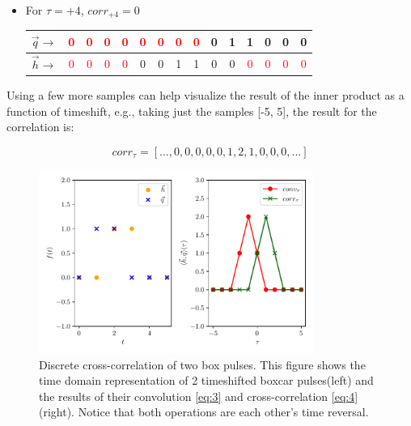 \begin{itemize}
\begin{center}
\end{center}


\item For $\tau = +4$, $corr_{+4}=0$

\begin{center}

\begin{tabular}{c|c|c|c|c| c|c|c|c|c|c |c|c|c|c|}

$\vec{q} \rightarrow$&\textcolor{red}{0}&\textcolor{red}{0}&\textcolor{red}{0}&\textcolor{red}{0}&\textcolor{red}{0}&\textcolor{red}{0}&\textcolor{red}{0}&\textcolor{red}{0}&0&1&1&0&0&0\\

\hline
$\vec{h} \rightarrow$&\textcolor{red}{0}&\textcolor{red}{0}&\textcolor{red}{0}&\textcolor{red}{0}&0&0&1&1&0&0&\textcolor{red}{0}&\textcolor{red}{0}&\textcolor{red}{0}&\textcolor{red}{0}
\end{tabular}

\end{center}

\end{itemize}

\vspace{1cm}

Using a few more samples can help visualize the result of the inner product as a function of timeshift, e.g., taking just the samples [-5, 5], the result for the correlation is:

$$corr_\tau = [...,0,0,0,0,0,1,2,1,0,0,0 ,...]$$



\begin{figure}[hbt!]
\begin{center}
\includegraphics[width=0.8\textwidth, angle=0]{images/Data_analysis/sig_proc/corr.pdf}
\captionsetup{width=0.8\textwidth}
\caption[Discrete cross-correlation of two box-pulses]{Discrete cross-correlation of two box pulses. This figure shows the time domain representation of 2 timeshifted boxcar pulses(left) and the results of their convolution \ref{eq:3} and cross-correlation \ref{eq:4}(right). Notice that both operations are each other's time reversal.}
\label{fig:3}
\end{center}
\end{figure}

